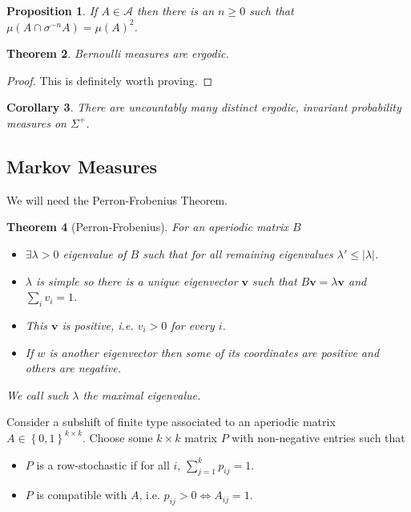 \documentclass[11pt]{article}
\newcommand{\abs}[1]{\left|#1\right|}
\newcommand{\mv}[1]{\textbf{#1}}
\newcommand{\mdf}[1]{{\color{red} #1}}
\newtheorem{prop}{Proposition}[section]
\newtheorem{theorem}[prop]{Theorem}
\newtheorem{cor}[prop]{Corollary}
\begin{document}
\begin{prop}
If $A\in\mathcal{A}$ then there is an $n\geq 0$ such that $\mu(A\cap \sigma^{-n}A)=\mu(A)^2$.
\end{prop}

\begin{theorem}
Bernoulli measures are ergodic.
\end{theorem}

\begin{proof}
This is definitely worth proving.
\end{proof}

\begin{cor}
There are uncountably many distinct ergodic, invariant probability measures on $\Sigma^+$.
\end{cor}

\subsection{Markov Measures}
We will need the Perron-Frobenius Theorem.

\begin{theorem}[Perron-Frobenius]
For an aperiodic matrix $B$
\begin{itemize}
	\item $\exists \lambda > 0$ eigenvalue of $B$ such that for all remaining eigenvalues $\lambda' \leq \abs{\lambda}$.
	\item $\lambda$ is simple so there is a unique eigenvector $\mv{v}$ such that $B\mv{v} = \lambda\mv{v}$ and $\sum_{i}v_i=1$.
	\item This $\mv{v}$ is positive, i.e. $v_i > 0$ for every $i$.
	\item If $w$ is another eigenvector then some of its coordinates are positive and others are negative.
\end{itemize}
We call such $\lambda$ the \mdf{maximal eigenvalue}.
\end{theorem}

Consider a subshift of finite type associated to an aperiodic matrix $A\in\left\{ 0, 1\right\}^{k\times k}$.
Choose some $k\times k$ matrix $P$ with non-negative entries such that
\begin{itemize}
	\item $P$ is a \mdf{row-stochastic} if for all $i$, $\sum_{j=1}^k p_{ij} =1$.
	\item $P$ is \mdf{compatible with $A$}, i.e. $p_{ij} >0 \iff A_{ij}=1$.
\end{itemize}
\end{document}
